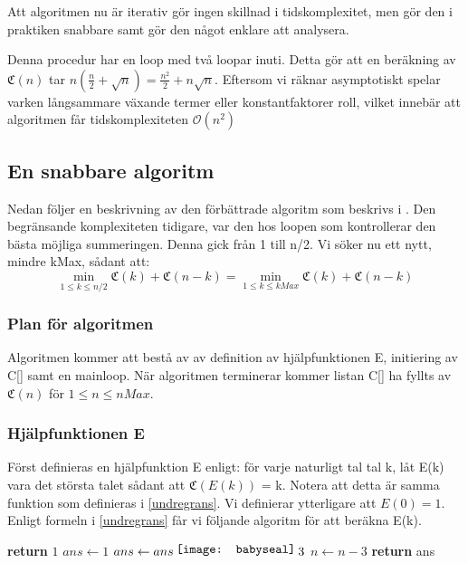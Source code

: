 \documentclass[a4paper,titlepage]{article}
\newcommand{\C}[1]{\mathfrak C \left( #1 \right)}
\renewcommand{\O}{\mathcal {O}}
\theoremstyle{definition}
\newcommand*\foobar{\texttt{[image: babyseal]}}
\renewcommand\cdot{\mathbin{\raisebox{2pt}{\foobar}}}
\begin{document}
    Att algoritmen nu är iterativ gör ingen skillnad i tidskomplexitet, men gör
    den i praktiken snabbare samt gör den något enklare att analysera.

    Denna procedur har en loop med två loopar inuti. Detta gör att en beräkning av
    $\C{n}$ tar $n\left(\frac{n}{2}+\sqrt n\right) = \frac{n^2}{2} + n\sqrt n$.
    Eftersom vi räknar asymptotiskt spelar varken långsammare växande termer eller
    konstantfaktorer roll,  vilket innebär att algoritmen får tidskomplexiteten
    $\O(n^2)$

    \subsection{En snabbare algoritm}
    Nedan följer en beskrivning av den förbättrade algoritm som beskrivs i \cite{algorithm_lune}.
    Den begränsande komplexiteten tidigare, var den hos loopen som kontrollerar den bästa möjliga summeringen. Denna gick från 1 till n/2. Vi söker nu ett nytt, mindre kMax, sådant att:
    $$\min\limits_{1 \leq k \leq n/2} \C{k} + \C{n-k} = \min\limits_{1 \leq k \leq kMax} \C{k} + \C{n-k}$$


    \subsubsection{Plan för algoritmen}
    Algoritmen kommer att bestå av av definition av hjälpfunktionen E, initiering av C[] samt en mainloop. När algoritmen terminerar kommer listan C[] ha fyllts av $\C{n}$ för
    $1 \leq n \leq nMax$. 

    \subsubsection{Hjälpfunktionen E}
    Först definieras en hjälpfunktion E enligt: för varje naturligt tal tal k, låt E(k) vara det största talet sådant att $\C{E(k)}$ = k.
    Notera att detta är samma funktion som definieras i \cref{undregrans}. Vi definierar ytterligare att $E(0) = 1$. Enligt formeln i \cref{undregrans} får vi följande algoritm för att beräkna E(k).

    \begin{algorithm}[H]
        \caption{$\O$}
        \begin{algorithmic}[1]
                    \State \textbf{return} $1$
                \EndIf
                \State $ans \gets 1$
                    \State $ans \gets ans \cdot 3$
                    \State $n \gets n-3$
                \EndWhile
            \State \textbf{return} ans
            \EndProcedure
        \end{algorithmic}
    \end{algorithm}
\end{document}

